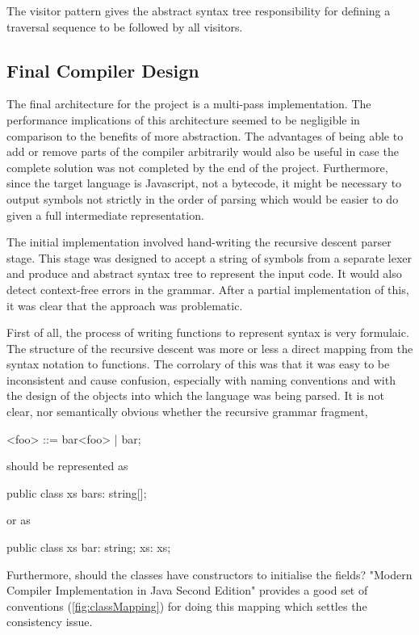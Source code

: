 \documentclass{article}
\begin{document}
The visitor pattern gives the abstract syntax tree responsibility for defining a traversal sequence to be followed by all visitors.

\subsection{Final Compiler Design}

The final architecture for the project is a multi-pass implementation. The performance implications of this architecture seemed to be negligible in comparison to the benefits of more abstraction. The advantages of being able to add or remove parts of the compiler arbitrarily would also be useful in case the complete solution was not completed by the end of the project. Furthermore, since the target language is Javascript, not a bytecode, it might be necessary to output symbols not strictly in the order of parsing which would be easier to do given a full intermediate representation.

The initial implementation involved hand-writing the recursive descent parser stage. This stage was designed to accept a string of symbols from a separate lexer and produce and abstract syntax tree to represent the input code. It would also detect context-free errors in the grammar. After a partial implementation of this, it was clear that the approach was problematic.

First of all, the process of writing functions to represent syntax is very formulaic. The structure of the recursive descent was more or less a direct mapping from the syntax notation to functions. The corrolary of this was that it was easy to be inconsistent and cause confusion, especially with naming conventions and with the design of the objects into which the language was being parsed. It is not clear, nor semantically obvious whether the recursive grammar fragment,

<foo> ::= bar<foo> | bar;

should be represented as

public class xs {
	bars: string[];
}

or as 

public class xs {
	bar: string;
	xs: xs;
}

Furthermore, should the classes have constructors to initialise the fields? "Modern Compiler Implementation in Java Second Edition" provides a good set of conventions (\ref{fig:classMapping}) for doing this mapping which settles the consistency issue. 
\end{document}
